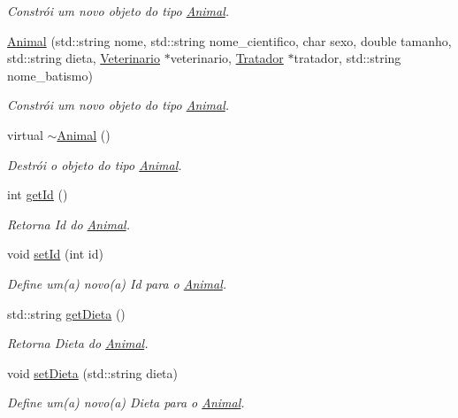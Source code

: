 \begin{DoxyCompactItemize}
\begin{DoxyCompactList}\small\item\em Constrói um novo objeto do tipo \hyperlink{classAnimal}{Animal}. \end{DoxyCompactList}\item 
\hyperlink{classAnimal_a4e5bbdaad6febb7b024d889dc78c1889}{Animal} (std\+::string nome, std\+::string nome\+\_\+cientifico, char sexo, double tamanho, std\+::string dieta, \hyperlink{classVeterinario}{Veterinario} $\ast$veterinario, \hyperlink{classTratador}{Tratador} $\ast$tratador, std\+::string nome\+\_\+batismo)
\begin{DoxyCompactList}\small\item\em Constrói um novo objeto do tipo \hyperlink{classAnimal}{Animal}. \end{DoxyCompactList}\item 
\mbox{\label{classAnimal_a476af25adde5f0dfa688129c8f86fa5c}} 
virtual \hyperlink{classAnimal_a476af25adde5f0dfa688129c8f86fa5c}{$\sim$\+Animal} ()
\begin{DoxyCompactList}\small\item\em Destrói o objeto do tipo \hyperlink{classAnimal}{Animal}. \end{DoxyCompactList}\item 
int \hyperlink{classAnimal_a2c27e56355bc2b40d65250da2bb8a102}{get\+Id} ()
\begin{DoxyCompactList}\small\item\em Retorna Id do \hyperlink{classAnimal}{Animal}. \end{DoxyCompactList}\item 
void \hyperlink{classAnimal_af5a262e8a6e04632a48307101494925c}{set\+Id} (int id)
\begin{DoxyCompactList}\small\item\em Define um(a) novo(a) Id para o \hyperlink{classAnimal}{Animal}. \end{DoxyCompactList}\item 
std\+::string \hyperlink{classAnimal_a6fcb9a0b8debecb58ca20dbf88bce329}{get\+Dieta} ()
\begin{DoxyCompactList}\small\item\em Retorna Dieta do \hyperlink{classAnimal}{Animal}. \end{DoxyCompactList}\item 
void \hyperlink{classAnimal_a1b6ae4e4360c2a3b15c1759a654ef84b}{set\+Dieta} (std\+::string dieta)
\begin{DoxyCompactList}\small\item\em Define um(a) novo(a) Dieta para o \hyperlink{classAnimal}{Animal}. \end{DoxyCompactList}\item 

\end{DoxyCompactItemize}
